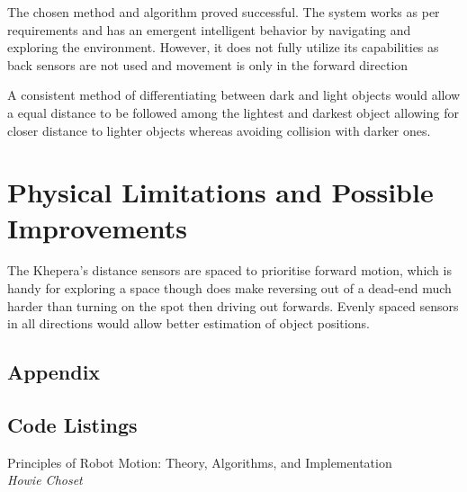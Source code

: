 \documentclass[11pt, a4paper]{article}
\begin{document}
The chosen method and algorithm proved successful. The system works as
per requirements and has an emergent intelligent behavior by
navigating and exploring the environment. However, it does not fully utilize its 
capabilities as back sensors are not used and movement is only in the
forward direction

A consistent method of differentiating between dark and light objects
would allow a equal distance to be followed among the lightest and darkest object
allowing for closer distance to lighter objects whereas avoiding collision with
darker ones.

\section{Physical Limitations and Possible Improvements}

The Khepera's distance sensors are spaced to prioritise forward motion, which is handy 
for exploring a space though does make reversing out of a dead-end much harder than 
turning on the spot then driving out forwards. Evenly spaced sensors in all directions would 
allow better estimation of object positions.



\begin{appendices}
\section*{Appendix}
\subsection{Code Listings}



\end{appendices}


\begin{thebibliography}{1}

Principles of Robot Motion: Theory, Algorithms, and Implementation\\
\textit{Howie Choset}

\end{thebibliography}
\end{document}
